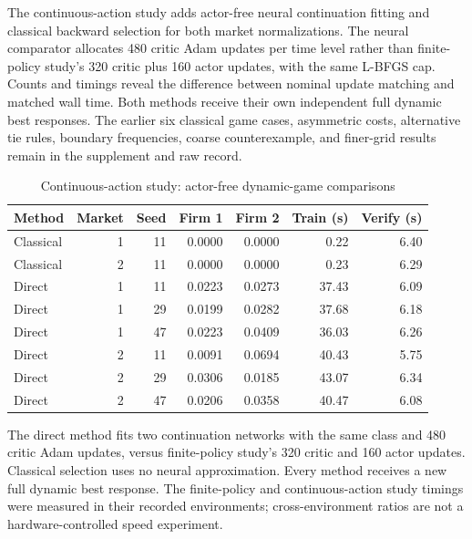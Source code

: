 \documentclass[ecta,nameyear,draft]{econsocart}
\theoremstyle{definition}
\theoremstyle{remark}
\begin{document}
The continuous-action study adds actor-free neural continuation fitting and classical backward selection for both market normalizations. The neural comparator allocates 480 critic Adam updates per time level rather than finite-policy study's 320 critic plus 160 actor updates, with the same L-BFGS cap. Counts and timings reveal the difference between nominal update matching and matched wall time. Both methods receive their own independent full dynamic best responses. The earlier six classical game cases, asymmetric costs, alternative tie rules, boundary frequencies, coarse counterexample, and finer-grid results remain in the supplement and raw record.

\begin{table}[htbp]\centering
\caption{Continuous-action study: actor-free dynamic-game comparisons}
\begin{small}\begin{tabular}{lrrrrrr}
\toprule
Method & Market & Seed & Firm 1 & Firm 2 & Train (s) & Verify (s) \\
\midrule
Classical & 1 & 11 & 0.0000 & 0.0000 & 0.22 & 6.40 \\
Classical & 2 & 11 & 0.0000 & 0.0000 & 0.23 & 6.29 \\
Direct & 1 & 11 & 0.0223 & 0.0273 & 37.43 & 6.09 \\
Direct & 1 & 29 & 0.0199 & 0.0282 & 37.68 & 6.18 \\
Direct & 1 & 47 & 0.0223 & 0.0409 & 36.03 & 6.26 \\
Direct & 2 & 11 & 0.0091 & 0.0694 & 40.43 & 5.75 \\
Direct & 2 & 29 & 0.0306 & 0.0185 & 43.07 & 6.34 \\
Direct & 2 & 47 & 0.0206 & 0.0358 & 40.47 & 6.08 \\
\bottomrule\end{tabular}\end{small}
\par\smallskip\begin{minipage}{0.96\linewidth}\footnotesize The direct method fits two continuation networks with the same class and 480 critic Adam updates, versus finite-policy study's 320 critic and 160 actor updates. Classical selection uses no neural approximation. Every method receives a new full dynamic best response. The finite-policy and continuous-action study timings were measured in their recorded environments; cross-environment ratios are not a hardware-controlled speed experiment.\end{minipage}
\end{table}
\end{document}
